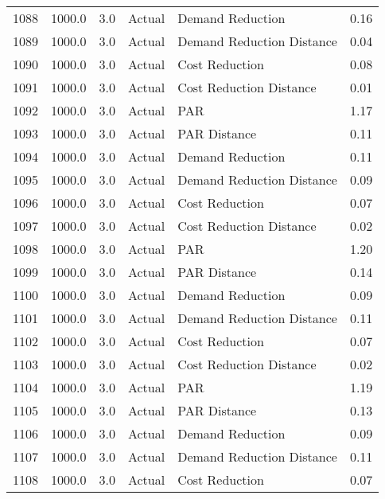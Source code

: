 \begin{longtable}{lrrllr}
1088 &       1000.0 &     3.0 &         Actual &           Demand Reduction &   0.16 \\
1089 &       1000.0 &     3.0 &         Actual &  Demand Reduction Distance &   0.04 \\
1090 &       1000.0 &     3.0 &         Actual &             Cost Reduction &   0.08 \\
1091 &       1000.0 &     3.0 &         Actual &    Cost Reduction Distance &   0.01 \\
1092 &       1000.0 &     3.0 &         Actual &                        PAR &   1.17 \\
1093 &       1000.0 &     3.0 &         Actual &               PAR Distance &   0.11 \\
1094 &       1000.0 &     3.0 &         Actual &           Demand Reduction &   0.11 \\
1095 &       1000.0 &     3.0 &         Actual &  Demand Reduction Distance &   0.09 \\
1096 &       1000.0 &     3.0 &         Actual &             Cost Reduction &   0.07 \\
1097 &       1000.0 &     3.0 &         Actual &    Cost Reduction Distance &   0.02 \\
1098 &       1000.0 &     3.0 &         Actual &                        PAR &   1.20 \\
1099 &       1000.0 &     3.0 &         Actual &               PAR Distance &   0.14 \\
1100 &       1000.0 &     3.0 &         Actual &           Demand Reduction &   0.09 \\
1101 &       1000.0 &     3.0 &         Actual &  Demand Reduction Distance &   0.11 \\
1102 &       1000.0 &     3.0 &         Actual &             Cost Reduction &   0.07 \\
1103 &       1000.0 &     3.0 &         Actual &    Cost Reduction Distance &   0.02 \\
1104 &       1000.0 &     3.0 &         Actual &                        PAR &   1.19 \\
1105 &       1000.0 &     3.0 &         Actual &               PAR Distance &   0.13 \\
1106 &       1000.0 &     3.0 &         Actual &           Demand Reduction &   0.09 \\
1107 &       1000.0 &     3.0 &         Actual &  Demand Reduction Distance &   0.11 \\
1108 &       1000.0 &     3.0 &         Actual &             Cost Reduction &   0.07 \\

\end{longtable}
